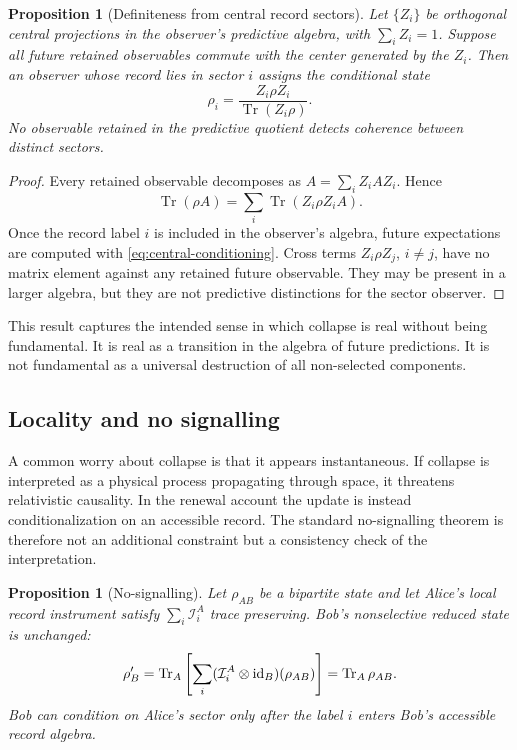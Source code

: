 \documentclass[11pt]{article}
\numberwithin{equation}{section}
\newtheorem{proposition}[theorem]{Proposition}
\theoremstyle{definition}
\theoremstyle{remark}
\newcommand{\Instr}{\mathcal I}
\newcommand{\Tr}{\operatorname{Tr}}
\begin{document}
\begin{proposition}[Definiteness from central record sectors]
\label{prop:definiteness}
Let \(\{Z_i\}\) be orthogonal central projections in the observer's predictive algebra, with \(\sum_iZ_i=1\).  Suppose all future retained observables commute with the center generated by the \(Z_i\).  Then an observer whose record lies in sector \(i\) assigns the conditional state
\begin{equation}
\label{eq:central-conditioning}
  \rho_i=\frac{Z_i\rho Z_i}{\Tr(Z_i\rho)}.
\end{equation}
No observable retained in the predictive quotient detects coherence between distinct sectors.
\end{proposition}

\begin{proof}
Every retained observable decomposes as \(A=\sum_i Z_iAZ_i\).  Hence
\[
  \Tr(\rho A)=\sum_i \Tr(Z_i\rho Z_i A).
\]
Once the record label \(i\) is included in the observer's algebra, future expectations are computed with \eqref{eq:central-conditioning}.  Cross terms \(Z_i\rho Z_j\), \(i\ne j\), have no matrix element against any retained future observable.  They may be present in a larger algebra, but they are not predictive distinctions for the sector observer.
\end{proof}

This result captures the intended sense in which collapse is real without being fundamental.  It is real as a transition in the algebra of future predictions.  It is not fundamental as a universal destruction of all non-selected components.

\subsection{Locality and no signalling}

A common worry about collapse is that it appears instantaneous.  If collapse is interpreted as a physical process propagating through space, it threatens relativistic causality.  In the renewal account the update is instead conditionalization on an accessible record.  The standard no-signalling theorem is therefore not an additional constraint but a consistency check of the interpretation.

\begin{proposition}[No-signalling]
\label{prop:no-signalling}
Let \(\rho_{AB}\) be a bipartite state and let Alice's local record instrument satisfy \(\sum_i\Instr_i^A\) trace preserving.  Bob's nonselective reduced state is unchanged:
\begin{equation}
\label{eq:no-signalling}
  \rho_B'
  =\Tr_A\left[\sum_i(\Instr_i^A\otimes{\rm id}_B)(\rho_{AB})\right]
  =\Tr_A\rho_{AB}.
\end{equation}
Bob can condition on Alice's sector only after the label \(i\) enters Bob's accessible record algebra.
\end{proposition}
\end{document}
